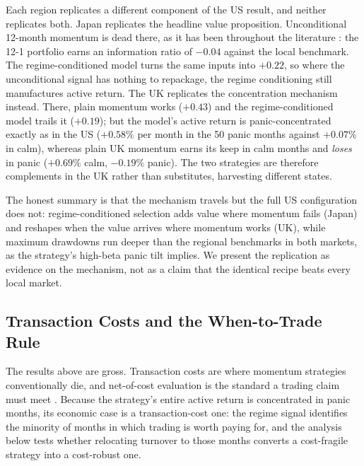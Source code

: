 Each region replicates a different component of the US result, and neither replicates both. Japan replicates the headline value proposition. Unconditional 12-month momentum is dead there, as it has been throughout the literature \citep{Asness2013}: the 12-1 portfolio earns an information ratio of $-0.04$ against the local benchmark. The regime-conditioned model turns the same inputs into $+0.22$, so where the unconditional signal has nothing to repackage, the regime conditioning still manufactures active return. The UK replicates the concentration mechanism instead. There, plain momentum works ($+0.43$) and the regime-conditioned model trails it ($+0.19$); but the model's active return is panic-concentrated exactly as in the US ($+0.58\%$ per month in the 50 panic months against $+0.07\%$ in calm), whereas plain UK momentum earns its keep in calm months and \emph{loses} in panic ($+0.69\%$ calm, $-0.19\%$ panic). The two strategies are therefore complements in the UK rather than substitutes, harvesting different states.

The honest summary is that the mechanism travels but the full US configuration does not: regime-conditioned selection adds value where momentum fails (Japan) and reshapes when the value arrives where momentum works (UK), while maximum drawdowns run deeper than the regional benchmarks in both markets, as the strategy's high-beta panic tilt implies. We present the replication as evidence on the mechanism, not as a claim that the identical recipe beats every local market.


\subsection{Transaction Costs and the When-to-Trade Rule}\label{sec:cost}

The results above are gross. Transaction costs are where momentum strategies conventionally die, and net-of-cost evaluation is the standard a trading claim must meet \citep{NovyMarxVelikov2016, DetzelNovyMarxVelikov2023}. Because the strategy's entire active return is concentrated in panic months, its economic case is a transaction-cost one: the regime signal identifies the minority of months in which trading is worth paying for, and the analysis below tests whether relocating turnover to those months converts a cost-fragile strategy into a cost-robust one.

